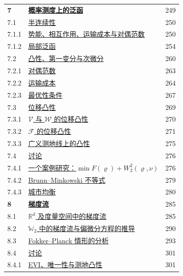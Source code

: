 \begin{longtable}{@{}p{1.4cm}p{11.2cm}r@{}}
\textbf{7}&\hyperref[sec:7]{\textbf{概率测度上的泛函}}&249\\
7.1&\hyperref[sec:7.1]{半连续性}&250\\
7.1.1&\hyperref[sec:7.1.1]{\hspace{1em}势能、相互作用、运输成本与对偶范数}&250\\
7.1.2&\hyperref[sec:7.1.2]{\hspace{1em}局部泛函}&254\\
7.2&\hyperref[sec:7.2]{凸性、第一变分与次微分}&260\\
7.2.1&\hyperref[sec:7.2.1]{\hspace{1em}对偶范数}&263\\
7.2.2&\hyperref[sec:7.2.2]{\hspace{1em}运输成本}&264\\
7.2.3&\hyperref[sec:7.2.3]{\hspace{1em}最优性条件}&267\\
7.3&\hyperref[sec:7.3]{位移凸性}&269\\
7.3.1&\hyperref[sec:7.3.1]{\hspace{1em}$\mathscr V$ 与 $\mathscr W$ 的位移凸性}&270\\
7.3.2&\hyperref[sec:7.3.2]{\hspace{1em}$\mathscr F$ 的位移凸性}&271\\
7.3.3&\hyperref[sec:7.3.3]{\hspace{1em}广义测地线上的凸性}&275\\
7.4&\hyperref[sec:7.4]{讨论}&276\\
7.4.1&\hyperref[sec:7.4.1]{\hspace{1em}一个案例研究：$\min F(\varrho)+W_2^2(\varrho,\nu)$}&276\\
7.4.2&\hyperref[sec:7.4.2]{\hspace{1em}Brunn--Minkowski 不等式}&279\\
7.4.3&\hyperref[sec:7.4.3]{\hspace{1em}城市均衡}&280\\
\textbf{8}&\hyperref[sec:8]{\textbf{梯度流}}&285\\
8.1&\hyperref[sec:8.1]{$\mathbb R^d$ 及度量空间中的梯度流}&285\\
8.2&\hyperref[sec:8.2]{$\mathbb W_2$ 中的梯度流与偏微分方程的推导}&290\\
8.3&\hyperref[sec:8.3]{Fokker--Planck 情形的分析}&293\\
8.4&\hyperref[sec:8.4]{讨论}&301\\
8.4.1&\hyperref[sec:8.4.1]{\hspace{1em}EVI、唯一性与测地凸性}&301\\

\end{longtable}
